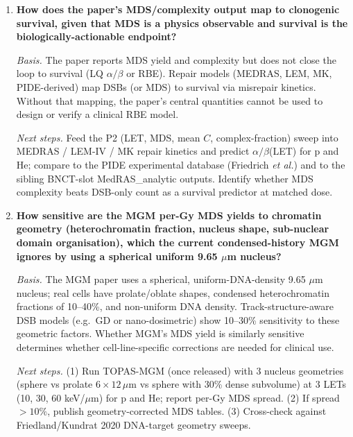 \begin{enumerate}
    \emph{Next steps.} (1) Extract or re-fit $a(y_F), b(y_F)$ at high
    $y_F$ using Geant4-DNA carbon/oxygen radial-energy tables; check
    whether a higher-order polynomial or a different functional form
    removes the $b \to 0$ crossing. (2) Once TOPAS-MGM is available, add
    carbon/oxygen ion source and run against TOPAS-nBio carbon reference
    at 3 LET points. (3) Publish an updated MGM validity range.

  \item \textbf{How does the paper's MDS/complexity output map to
    clonogenic survival, given that MDS is a physics observable and
    survival is the biologically-actionable endpoint?}

    \emph{Basis.} The paper reports MDS yield and complexity but does not
    close the loop to survival (LQ $\alpha/\beta$ or RBE). Repair models
    (MEDRAS, LEM, MK, PIDE-derived) map DSBs (or MDS) to survival via
    misrepair kinetics. Without that mapping, the paper's central
    quantities cannot be used to design or verify a clinical RBE model.

    \emph{Next steps.} Feed the P2 (LET, MDS, mean $C$, complex-fraction)
    sweep into MEDRAS / LEM-IV / MK repair kinetics and predict
    $\alpha/\beta$(LET) for p and He; compare to the PIDE experimental
    database (Friedrich \emph{et al.}) and to the sibling BNCT-slot
    MedRAS\_analytic outputs. Identify whether MDS complexity beats
    DSB-only count as a survival predictor at matched dose.

  \item \textbf{How sensitive are the MGM per-Gy MDS yields to chromatin
    geometry (heterochromatin fraction, nucleus shape, sub-nuclear domain
    organisation), which the current condensed-history MGM ignores by
    using a spherical uniform 9.65 $\mu$m nucleus?}

    \emph{Basis.} The MGM paper uses a spherical, uniform-DNA-density
    9.65 $\mu$m nucleus; real cells have prolate/oblate shapes, condensed
    heterochromatin fractions of 10--40\%, and non-uniform DNA density.
    Track-structure-aware DSB models (e.g.\ GD or nano-dosimetric) show
    10--30\% sensitivity to these geometric factors. Whether MGM's MDS
    yield is similarly sensitive determines whether cell-line-specific
    corrections are needed for clinical use.

    \emph{Next steps.} (1) Run TOPAS-MGM (once released) with 3 nucleus
    geometries (sphere vs prolate $6 \times 12\,\mu$m vs sphere with 30\%
    dense subvolume) at 3 LETs (10, 30, 60 keV/$\mu$m) for p and He;
    report per-Gy MDS spread. (2) If spread $> 10\%$, publish
    geometry-corrected MDS tables. (3) Cross-check against
    Friedland/Kundrat 2020 DNA-target geometry sweeps.


\end{enumerate}
